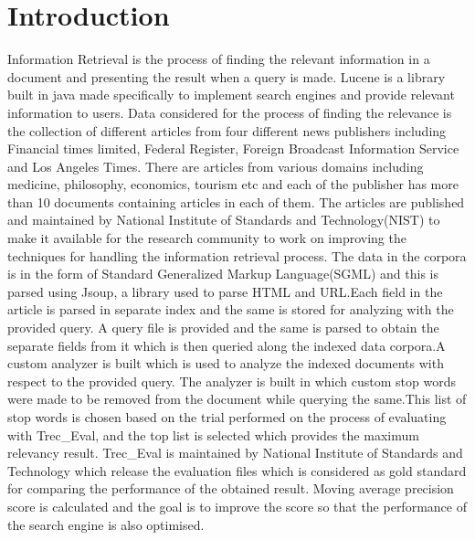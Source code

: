 \documentclass[sigconf]{acmart}
\begin{document}
\section{Introduction}
Information Retrieval is the process of finding the relevant information in a document and presenting the result when a query is made.
Lucene\cite{lucene} is a library built in java made specifically to implement search engines and provide relevant information to users.
Data considered for the process of finding the relevance is the collection of different articles from four different news publishers including Financial times limited, Federal Register, Foreign Broadcast Information Service and Los Angeles Times.
There are articles from various domains including medicine, philosophy, economics, tourism etc and each of the publisher has more than 10 documents containing articles in each of them.
The articles are published and maintained by National Institute of Standards and Technology(NIST) to make it available for the research community to work on improving the techniques for handling the information retrieval process.
The data in the corpora is in the form of Standard Generalized Markup Language(SGML) and this is parsed using Jsoup\cite{jsoup}, a library used to parse HTML and URL.Each field in the article is parsed in separate index and the same is stored for analyzing with the provided query.
A query file is provided and the same is parsed to obtain the separate fields from it which is then queried along the indexed data corpora.A custom analyzer is built which is used to analyze the indexed documents with respect to the provided query.
The analyzer is built in which custom stop words were made to be removed from the document while querying the same.This list of stop words is chosen based on the trial performed on the process of evaluating with Trec\_Eval\cite{trec_eval}, and the top list is selected which provides the maximum relevancy result.
Trec\_Eval is maintained by National Institute of Standards and Technology which release the evaluation files  which is considered as gold standard for comparing the performance of the obtained result.
Moving average precision score is calculated and the goal is to improve the score so that the performance of the search engine is also optimised.
\vspace{0.2cm}









\vspace{2cm}
\appendix

\end{document}
